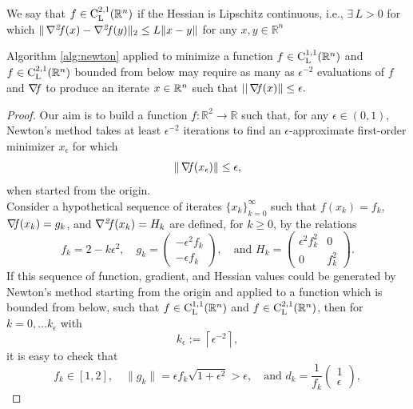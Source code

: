 \documentclass[10pt,a4paper]{article}
\begin{document}
\begin{definition}
	We say that $f\in \mathord{\mathrm{C^{2,1}_{L}}}(\mathbb{R}^n)$ if the Hessian is Lipschitz continuous, i.e., $ \exists\, L > 0$ for which $\|\operatorname*{\mathit{\nabla^2 \!f}}(x) - \operatorname*{\mathit{\nabla^2 \!f}}(y)\|_2 \leq L\|x - y\|$ for any $x, y \in \mathbb{R}^n$
\end{definition}
\begin{theorem}\label{thm:slow_newton}
	Algorithm \ref{alg:newton} applied to minimize a function $f\in \mathord{\mathrm{C^{1,1}_{L}}}(\mathbb{R}^n)$ and $f\in \mathord{\mathrm{C^{2,1}_{L}}}(\mathbb{R}^n)$ bounded from below may require as many as $\epsilon^{-2}$ evaluations of $f$ and $\operatorname*{\mathit{\nabla \!f}}$ to produce an iterate $x\in \mathbb{R}^n$ such that $||\operatorname*{\mathit{\nabla \!f}} (x)\|\leq \epsilon.$
\end{theorem}
\begin{proof}
	Our aim is to build a function $f : \mathbb{R}^2 \to \mathbb{R}$ such that, for any $\epsilon \in (0,1)$, Newton's method takes at least $\epsilon^{-2}$ iterations to find an $\epsilon$-approximate first-order minimizer $x_\epsilon$ for which
	\begin{equation*}
		\|\operatorname*{\mathit{\nabla \!f}}(x_\epsilon)\| \leq \epsilon,
	\end{equation*}
	when started from the origin.\\
	Consider a hypothetical sequence of iterates $\{x_k\}_{k=0}^\infty$ such that $f(x_k) = f_k$, $\operatorname*{\mathit{\nabla \!f}}(x_k) = g_k$, and $\operatorname*{\mathit{\nabla^2 \!f}}(x_k) = H_k$ are defined, for $k \geq 0$, by the relations
	\begin{equation}\label{eq:def_fk}
		f_k = 2 - k\epsilon^2, \quad g_k = \begin{pmatrix} -\epsilon^2 f_k \\ -\epsilon f_k \end{pmatrix}, \quad \text{and } H_k = \begin{pmatrix} \epsilon^2 f_k^2 & 0 \\ 0 & f_k^2 \end{pmatrix}.
	\end{equation}
	If this sequence of function, gradient, and Hessian values could be generated by Newton's method starting from the origin and applied to a function which is bounded from below, such that $f\in \mathord{\mathrm{C^{1,1}_{L}}}(\mathbb{R}^n)$ and $f\in \mathord{\mathrm{C^{2,1}_{L}}}(\mathbb{R}^n)$, then for $k=0,\dots k_\epsilon$ with
	\begin{equation*}
		k_\epsilon := \left\lceil \epsilon^{-2} \right\rceil,
	\end{equation*}
	it is easy to check that
	\begin{equation*}
		f_k \in [1,2], \quad \|g_k\| = \epsilon f_k \sqrt{1 + \epsilon^2} > \epsilon, \quad \text{and } d_k = \frac{1}{f_k} \begin{pmatrix} 1 \\ \epsilon \end{pmatrix},

\end{equation*}
\end{proof}
\end{document}
